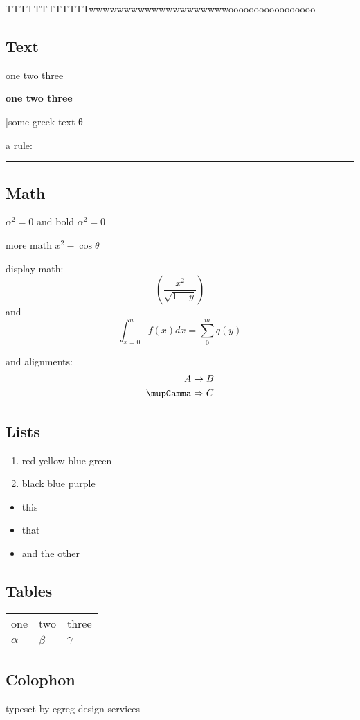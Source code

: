 \documentclass{article}
\begin{document}
TTTTTTTTTTTTwwwwwwwwwwwwwwwwwwwwooooooooooooooooo




\subsection{Text}

one two three

\textbf{one two three}

[some greek text θ]

a  rule: \rule{3cm}{1pt}

\subsection{Math}

$\alpha^2=0$ and bold {\boldmath $\alpha^2=0$}



more math $x^2-\cos θ$


display math:
\[\left(\frac{x^2}{\sqrt{1+y}}\right)\]
and
\[\int_{x=0}^n f(x) dx = \sum_0^m q(y)\]

and alignments:
\begin{align}
A &\rightarrow B\\
\mupGamma &\Rightarrow C
\end{align}


\subsection{Lists}

\begin{enumerate}
\item red yellow blue green
\item black blue purple
\end{enumerate}

\begin{itemize}
\item this
\item that
\item and the other
\end{itemize}


\subsection{Tables}



\begin{center}

\begin{tabular}{|l|l|l|}
\cline{1-3}
one & two & three\\
$\alpha$ & $\beta$ & $\gamma$\\
\cline{1-3}
\end{tabular}

\end{center}

\subsection{Colophon}
\raggedleft
typeset by egreg design services
\end{document}
